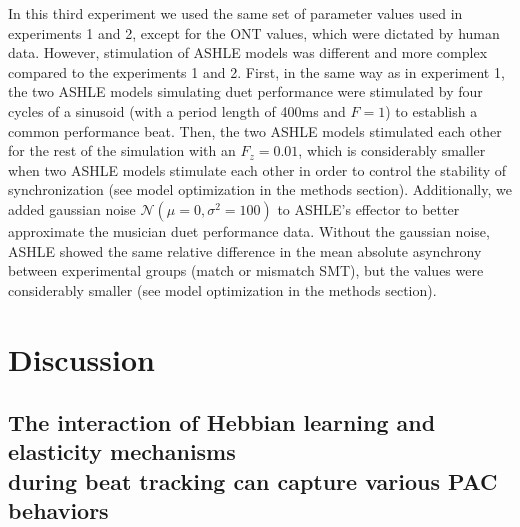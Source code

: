 \documentclass{report}
\begin{document}
In this third experiment we used the same set of parameter values used in experiments 1 and 2, except for the ONT values, which were dictated by human data. However, stimulation of ASHLE models was different and more complex compared to the experiments 1 and 2. First, in the same way as in experiment 1, the two ASHLE models simulating duet performance were stimulated by four cycles of a sinusoid (with a period length of 400ms and $F = 1$) to establish a common performance beat. Then, the two ASHLE models stimulated each other for the rest of the simulation with an $F_z = 0.01$, which is considerably smaller when two ASHLE models stimulate each other in order to control the stability of synchronization (see model optimization in the methods section). Additionally, we added gaussian noise $\mathcal{N}(\mu=0, \sigma^2=100)$ to ASHLE's effector to better approximate the musician duet performance data. Without the gaussian noise, ASHLE showed the same relative difference in the mean absolute asynchrony between experimental groups (match or mismatch SMT), but the values were considerably smaller (see  model optimization in the methods section).

\section{Discussion}

\subsection{The interaction of Hebbian learning and elasticity mechanisms \\ during beat tracking can capture various PAC behaviors}
\end{document}
